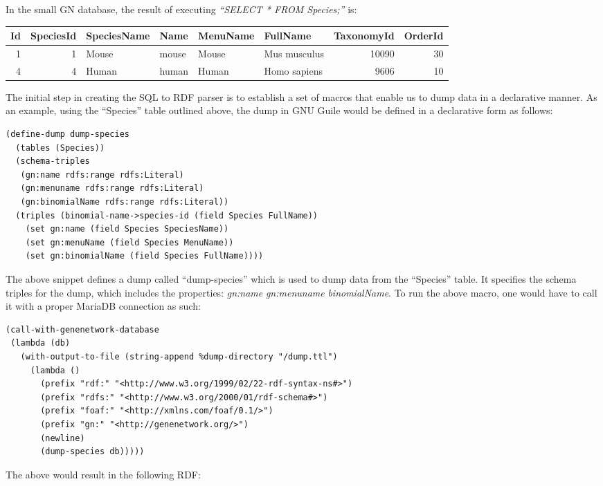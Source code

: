 In the small GN database, the result of executing \textit{``SELECT * FROM Species;''} is:

\begin{center}
\begin{tabular}{rrllllrr}
Id & SpeciesId & SpeciesName & Name & MenuName & FullName & TaxonomyId & OrderId\\
\hline
1 & 1 & Mouse & mouse & Mouse & Mus musculus & 10090 & 30\\
4 & 4 & Human & human & Human & Homo sapiens & 9606 & 10\\
\hline
\end{tabular}
\end{center}

The initial step in creating the SQL to RDF parser is to establish a set of macros that enable us to dump data in a declarative manner.  As an example, using the ``Species'' table outlined above, the dump in GNU Guile would be defined in a declarative form as follows:

\begin{verbatim}
(define-dump dump-species
  (tables (Species))
  (schema-triples
   (gn:name rdfs:range rdfs:Literal)
   (gn:menuname rdfs:range rdfs:Literal)
   (gn:binomialName rdfs:range rdfs:Literal))
  (triples (binomial-name->species-id (field Species FullName))
    (set gn:name (field Species SpeciesName))
    (set gn:menuName (field Species MenuName))
    (set gn:binomialName (field Species FullName))))
\end{verbatim}


The above snippet defines a dump called ``dump-species'' which is used to dump data from the ``Species'' table.  It specifies the schema triples for the dump, which includes the properties: \textit{gn:name} \textit{gn:menuname} \textit{binomialName}.  To run the above macro, one would have to call it with a proper MariaDB connection as such:
\clearpage
\begin{verbatim}
(call-with-genenetwork-database
 (lambda (db)
   (with-output-to-file (string-append %dump-directory "/dump.ttl")
     (lambda ()
       (prefix "rdf:" "<http://www.w3.org/1999/02/22-rdf-syntax-ns#>")
       (prefix "rdfs:" "<http://www.w3.org/2000/01/rdf-schema#>")
       (prefix "foaf:" "<http://xmlns.com/foaf/0.1/>")
       (prefix "gn:" "<http://genenetwork.org/>")
       (newline)
       (dump-species db)))))
\end{verbatim}

The above would result in the following RDF:

